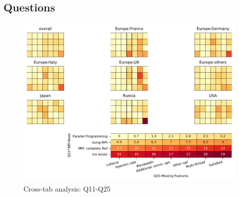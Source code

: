 
\subsection{Questions}


\begin{figure}
\begin{center}
\includegraphics[width=12cm]{../pdfs/Q11-Q25.pdf}
\caption{Cross-tab analysis: Q11-Q25}
\label{fig:Q11-Q25}
\end{center}
\end{figure}
